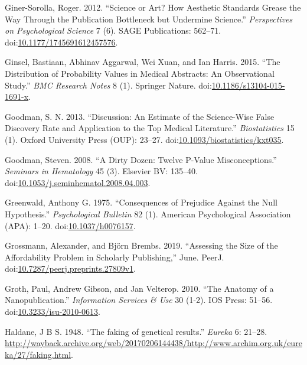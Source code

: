 \documentclass[a5paper]{book}
\begin{document}
\hypertarget{ref-doi:10.1177ux2f1745691612457576}{}
Giner-Sorolla, Roger. 2012. ``Science or Art? How Aesthetic Standards
Grease the Way Through the Publication Bottleneck but Undermine
Science.'' \emph{Perspectives on Psychological Science} 7 (6). SAGE
Publications: 562--71.
doi:\href{https://doi.org/10.1177/1745691612457576}{10.1177/1745691612457576}.

\hypertarget{ref-doi:10.1186ux2fs13104-015-1691-x}{}
Ginsel, Bastiaan, Abhinav Aggarwal, Wei Xuan, and Ian Harris. 2015.
``The Distribution of Probability Values in Medical Abstracts: An
Observational Study.'' \emph{BMC Research Notes} 8 (1). Springer Nature.
doi:\href{https://doi.org/10.1186/s13104-015-1691-x}{10.1186/s13104-015-1691-x}.

\hypertarget{ref-doi:10.1093ux2fbiostatisticsux2fkxt035}{}
Goodman, S. N. 2013. ``Discussion: An Estimate of the Science-Wise False
Discovery Rate and Application to the Top Medical Literature.''
\emph{Biostatistics} 15 (1). Oxford University Press (OUP): 23--27.
doi:\href{https://doi.org/10.1093/biostatistics/kxt035}{10.1093/biostatistics/kxt035}.

\hypertarget{ref-doi:10.1053ux2fj.seminhematol.2008.04.003}{}
Goodman, Steven. 2008. ``A Dirty Dozen: Twelve P-Value Misconceptions.''
\emph{Seminars in Hematology} 45 (3). Elsevier BV: 135--40.
doi:\href{https://doi.org/10.1053/j.seminhematol.2008.04.003}{10.1053/j.seminhematol.2008.04.003}.

\hypertarget{ref-doi:10.1037ux2fh0076157}{}
Greenwald, Anthony G. 1975. ``Consequences of Prejudice Against the Null
Hypothesis.'' \emph{Psychological Bulletin} 82 (1). American
Psychological Association (APA): 1--20.
doi:\href{https://doi.org/10.1037/h0076157}{10.1037/h0076157}.

\hypertarget{ref-doi:10.7287ux2fpeerj.preprints.27809v1}{}
Grossmann, Alexander, and Björn Brembs. 2019. ``Assessing the Size of
the Affordability Problem in Scholarly Publishing,'' June. PeerJ.
doi:\href{https://doi.org/10.7287/peerj.preprints.27809v1}{10.7287/peerj.preprints.27809v1}.

\hypertarget{ref-doi:10.3233ux2fisu-2010-0613}{}
Groth, Paul, Andrew Gibson, and Jan Velterop. 2010. ``The Anatomy of a
Nanopublication.'' \emph{Information Services \& Use} 30 (1-2). IOS
Press: 51--56.
doi:\href{https://doi.org/10.3233/isu-2010-0613}{10.3233/isu-2010-0613}.

\hypertarget{ref-Haldane1948-nm}{}
Haldane, J B S. 1948. ``The faking of genetical results.'' \emph{Eureka}
6: 21--28.
\url{http://wayback.archive.org/web/20170206144438/http://www.archim.org.uk/eureka/27/faking.html}.
\end{document}
